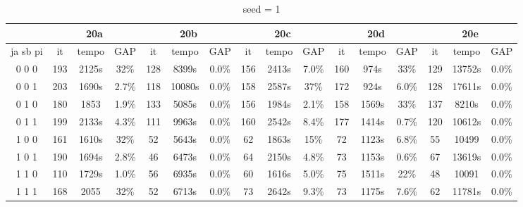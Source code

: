 \documentclass[12pt]{article}
\begin{document}
\begin{table}[!htb]
\centering
\footnotesize
\begin{tabular}{|c||c|c|c||c|c|c||c|c|c||c|c|c||c|c|c|}
\cline{2-16}
\multicolumn{1}{c||}{} & \multicolumn{3}{c||}{20a} & \multicolumn{3}{c||}{20b} & \multicolumn{3}{c||}{20c} & \multicolumn{3}{c||}{20d} & \multicolumn{3}{c|}{20e}\\
\hline
ja sb pi & it & tempo & GAP & it & tempo & GAP & it & tempo & GAP & it & tempo & GAP & it & tempo & GAP \\
\hline
0 0 0 & 193 & 2125s & 32\% & 128 & 8399s & 0.0\% & 156 & 2413s & 7.0\% & 160 & 974s & 33\% & 129 & 13752s & 0.0\% \\
0 0 1 & 203 & 1690s & 2.7\% & 118 & 10080s & 0.0\% & 158 & 2587s & 37\% & 172 & 924s & 6.0\% & 128 & 17611s & 0.0\% \\
0 1 0 & 180 & 1853 & 1.9\% & 133 & 5085s & 0.0\% & 156 & 1984s & 2.1\% & 158 & 1569s & 33\% & 137 & 8210s & 0.0\% \\
0 1 1 & 199 & 2133s & 4.3\% & 111 & 9963s & 0.0\% & 160 & 2542s & 8.4\% & 177 & 1414s & 0.7\% & 120 & 10612s & 0.0\% \\
1 0 0 & 161 & 1610s & 32\% & 52 & 5643s & 0.0\% & 62 & 1863s & 15\% & 72 & 1123s & 6.8\% & 55 & 10499 & 0.0\% \\
1 0 1 & 190 & 1694s & 2.8\% & 46 & 6473s & 0.0\% & 64 & 2150s & 4.8\% & 73 & 1153s & 0.6\% & 67 & 13619s & 0.0\% \\
1 1 0 & 110 & 1729s & 1.0\% & 56 & 6935s & 0.0\% & 60 & 1616s & 5.0\% & 75 & 1511s & 22\% & 48 & 10091 & 0.0\% \\
1 1 1 & 168 & 2055 & 32\% & 52 & 6713s & 0.0\% & 73 & 2642s & 9.3\% & 73 & 1175s & 7.6\% & 62 & 11781s & 0.0\% \\
\hline
\end{tabular}
\caption{seed = 1}
\end{table}
\end{document}
